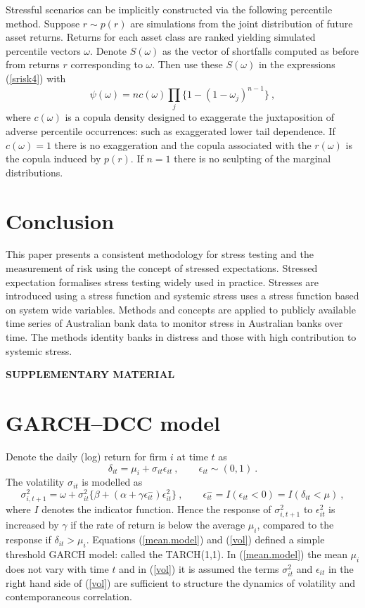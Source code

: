 \documentclass[authoryear]{elsarticle}
\newcommand{\eps}{\epsilon}
\newcommand{\eref}[1]{(\ref{#1})}
\newcommand{\cq}{\ , \qquad}
\newcommand{\be}[1]{\begin{equation}\label{#1}}
\newcommand{\ee}{\end{equation}}
\begin{document}
Stressful scenarios can be implicitly constructed via the following percentile method.   Suppose $r\sim p(r)$ are simulations from the joint distribution of future asset returns.   Returns for each asset class are  ranked yielding simulated percentile vectors $\omega$.   Denote $S(\omega)$ as the vector of shortfalls computed as before from returns $r$ corresponding to $\omega$.   Then use these $S(\omega)$  in the expressions \eref{srisk4} with
$$
\psi(\omega) = nc(\omega)\prod_j \{1-(1-\omega_j)^{n-1}\}\ ,
$$
where $c(\omega)$ is a copula density designed to exaggerate the juxtaposition of  adverse percentile occurrences: such as exaggerated lower tail dependence.   If $c(\omega)= 1$  there is no exaggeration  and the copula associated with the $r(\omega)$ is the copula induced by $p(r)$.  If $n=1$ there is no sculpting of the marginal distributions.



\section{Conclusion}\label{conclude}

This paper presents a consistent methodology for stress testing and the measurement of  risk using the concept of stressed expectations.   Stressed expectation  formalises stress testing widely used in practice.  Stresses are introduced using a stress function and systemic stress uses a stress function based on system wide variables.   Methods and concepts are applied to publicly available time series of Australian bank data to monitor stress in Australian banks over time.   The methods identity banks in distress and those with high contribution to systemic stress.

\bigskip
\begin{center}
{\large\bf SUPPLEMENTARY MATERIAL}
\end{center}

\appendix
\renewcommand*{\thesection}{\Alph{section}}

\section{GARCH--DCC model}\label{garchdcc}

Denote the daily (log) return for firm $i$ at time $t$ as
\newcommand{\vareps}{\varepsilon}
\be{mean.model}
\delta_{it}=\mu_i+\sigma_{it}\eps_{it}\cq \eps_{it}\sim (0,1)\ .
\ee
The volatility $\sigma_{it}$ is modelled as
\be{vol}
\sigma_{i,t+1}^2 = \omega+ \sigma^2_{it}\{\beta+(\alpha+\gamma \eps^-_{it})\eps_{it}^2\}  \cq  \eps^-_{it}= I(\eps_{it}<0)=I(\delta_{it}<\mu)\ ,
\ee
where $I$ denotes the indicator function.  Hence the response of $\sigma_{i,t+1}^2$ to $\eps_{it}^2$  is increased by $\gamma$   if
the rate of return is below the average $\mu_i$, compared to the response if $\delta_{it}>\mu_i$.  Equations \eref{mean.model} and \eref{vol} defined a simple threshold GARCH model:  called the TARCH(1,1).   In \eref{mean.model} the mean $\mu_i$ does not vary with time $t$ and in \eref{vol} it is assumed the terms  $\sigma_{it}^2$ and $\eps_{it}$ in the right hand side of \eref{vol} are sufficient to structure the dynamics of volatility and contemporaneous correlation.
\end{document}
